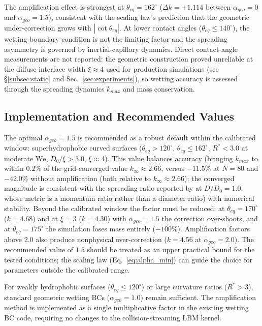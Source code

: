 The amplification effect is strongest at $\theta_{eq}=162^\circ$ ($\Delta k = +1.114$ between $\alpha_{geo}=0$ and $\alpha_{geo}=1.5$), consistent with the scaling law's prediction that the geometric under-correction grows with $|\cot\theta_{eq}|$. At lower contact angles ($\theta_{eq} \leq 140^\circ$), the wetting boundary condition is not the limiting factor and the spreading asymmetry is governed by inertial-capillary dynamics. Direct contact-angle measurements are not reported: the geometric construction proved unreliable at the diffuse-interface width $\xi \approx 4$ used for production simulations (see \S\ref{subsec:static} and Sec.~\ref{sec:experiments}), so wetting accuracy is assessed through the spreading dynamics $k_{max}$ and mass conservation.

\subsection{Implementation and Recommended Values}

The optimal $\alpha_{geo} = 1.5$ is recommended as a robust default within the calibrated window: superhydrophobic curved surfaces ($\theta_{eq} > 120^\circ$, $\theta_{eq} \leq 162^\circ$, $R^* < 3.0$ at moderate $\mathrm{We}$, $D_0/\xi > 3.0$, $\xi \approx 4$). This value balances accuracy (bringing $k_{max}$ to within $0.2\%$ of the grid-converged value $k_\infty \approx 2.66$, versus $-11.5\%$ at $N=80$ and $-42.0\%$ without amplification (both relative to $k_\infty \approx 2.66$); the converged magnitude is consistent with the spreading ratio reported by \citet{liu2015symmetry} at $D/D_0=1.0$, whose metric is a momentum ratio rather than a diameter ratio) with numerical stability. Beyond the calibrated window the factor must be reduced: at $\theta_{eq}=170^\circ$ ($k=4.68$) and at $\xi=3$ ($k=4.30$) with $\alpha_{geo}=1.5$ the correction over-shoots, and at $\theta_{eq}=175^\circ$ the simulation loses mass entirely ($-100\%$). Amplification factors above $2.0$ also produce nonphysical over-correction ($k=4.56$ at $\alpha_{geo}=2.0$). The recommended value of $1.5$ should be treated as an upper practical bound for the tested conditions; the scaling law (Eq.~\ref{eq:alpha_min}) can guide the choice for parameters outside the calibrated range.

For weakly hydrophobic surfaces ($\theta_{eq} \leq 120^\circ$) or large curvature ratios ($R^* > 3$), standard geometric wetting BCs ($\alpha_{geo}=1.0$) remain sufficient. The amplification method is implemented as a single multiplicative factor in the existing wetting BC code, requiring no changes to the collision-streaming LBM kernel.
